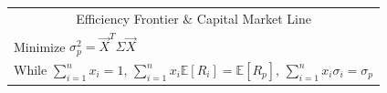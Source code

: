 \documentclass[10pt,landscape]{article}
\begin{document}
\begin{multicols}{3}
\begin{tcolorbox}[boxsep=0pt, left=0pt, right=0pt, top=0pt, bottom=0pt]
\begin{tabular}{p{2cm} p{5cm}}
            \multicolumn{2}{c}{Efficiency Frontier \& Capital Market Line}                                                                                                                                                                                                         \\
            \multicolumn{2}{l}{Minimize $\sigma_p^2 = \overrightarrow{X}^T \Sigma \overrightarrow{X}$}                                                                                                                                                                             \\
            \multicolumn{2}{l}{While $\sum_{i=1}^{n} x_i = 1, \, \sum_{i=1}^{n} x_i \mathbb{E}[R_i] = \mathbb{E}[R_p],\, \sum_{i=1}^{n} x_i \sigma_i = \sigma_p$}
        \end{tabular}
    \end{tcolorbox}

\end{multicols}
\end{document}
